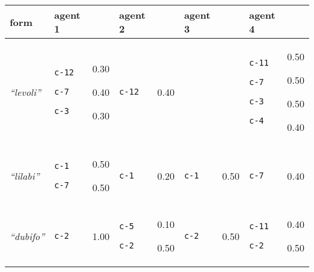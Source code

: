 
{\renewcommand{\arraystretch}{1.5}
\begin{tabular}{@{}p{1.2cm}|p{1.6cm}@{}p{0.8cm}@{}|p{1.6cm}@{}p{0.8cm}@{}|p{1.6cm}@{}p{0.8cm}@{}|p{1.6cm}@{}p{0.8cm}@{}}
form & agent 1 &  & agent 2 &  & agent 3 &  & agent 4 & \\
\hline
\textit{``levoli''}&\texttt{c-12}


\texttt{c-7}


\texttt{c-3}
&0.30

0.40

0.30&\texttt{c-12}
&0.40&&&\texttt{c-11}


\texttt{c-7}


\texttt{c-3}


\texttt{c-4}
&0.50

0.50

0.50

0.40\\
\hline
\textit{``lilabi''}&\texttt{c-1}


\texttt{c-7}
&0.50

0.50&\texttt{c-1}
&0.20&\texttt{c-1}
&0.50&\texttt{c-7}
&0.40\\
\hline
\textit{``dubifo''}&\texttt{c-2}
&1.00&\texttt{c-5}


\texttt{c-2}
&0.10

0.50&\texttt{c-2}
&0.50&\texttt{c-11}


\texttt{c-2}
&0.40

0.50\\
\end{tabular}}

